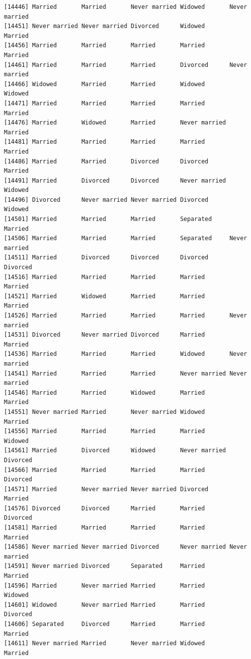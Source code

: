 \documentclass[
  letterpaper,
  DIV=11,
  numbers=noendperiod,
  oneside]{scrartcl}
\begin{document}
\begin{verbatim}
[14446] Married       Married       Never married Widowed       Never married
[14451] Never married Never married Divorced      Widowed       Married      
[14456] Married       Married       Married       Married       Married      
[14461] Married       Married       Married       Divorced      Never married
[14466] Widowed       Married       Married       Widowed       Widowed      
[14471] Married       Married       Married       Married       Married      
[14476] Married       Widowed       Married       Never married Married      
[14481] Married       Married       Married       Married       Married      
[14486] Married       Married       Divorced      Divorced      Married      
[14491] Married       Divorced      Divorced      Never married Widowed      
[14496] Divorced      Never married Never married Divorced      Widowed      
[14501] Married       Married       Married       Separated     Married      
[14506] Married       Married       Married       Separated     Never married
[14511] Married       Divorced      Divorced      Divorced      Divorced     
[14516] Married       Married       Married       Married       Married      
[14521] Married       Widowed       Married       Married       Married      
[14526] Married       Married       Married       Married       Never married
[14531] Divorced      Never married Divorced      Married       Married      
[14536] Married       Married       Married       Widowed       Never married
[14541] Married       Married       Married       Never married Never married
[14546] Married       Married       Widowed       Married       Married      
[14551] Never married Married       Never married Widowed       Married      
[14556] Married       Married       Married       Married       Widowed      
[14561] Married       Divorced      Widowed       Never married Divorced     
[14566] Married       Married       Married       Married       Divorced     
[14571] Married       Never married Never married Divorced      Married      
[14576] Divorced      Divorced      Married       Married       Divorced     
[14581] Married       Married       Married       Married       Married      
[14586] Never married Never married Divorced      Never married Never married
[14591] Never married Divorced      Separated     Married       Married      
[14596] Married       Never married Married       Married       Widowed      
[14601] Widowed       Never married Married       Married       Divorced     
[14606] Separated     Divorced      Married       Married       Married      
[14611] Never married Married       Never married Widowed       Married      

\end{verbatim}
\end{document}
